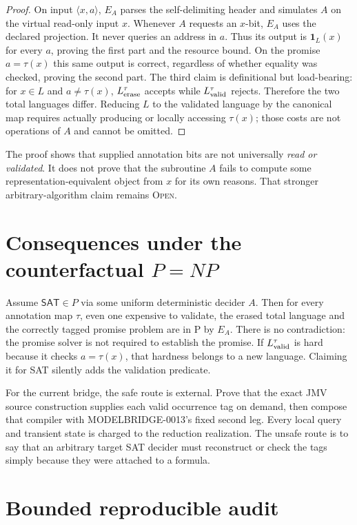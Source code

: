 \documentclass[11pt]{article}
\newcommand{\status}[1]{\textsc{#1}}
\newcommand{\SAT}{\mathsf{SAT}}
\begin{document}
\begin{proof}
On input $\langle x,a\rangle$, $E_A$ parses the self-delimiting header and
simulates $A$ on the virtual read-only input $x$.  Whenever $A$ requests an
$x$-bit, $E_A$ uses the declared projection.  It never queries an address in
$a$.  Thus its output is $\mathbf1_L(x)$ for every $a$, proving the first
part and the resource bound.  On the promise $a=\tau(x)$ this same output is
correct, regardless of whether equality was checked, proving the second
part.  The third claim is definitional but load-bearing: for $x\in L$ and
$a\ne\tau(x)$, $L_{\rm erase}^{\tau}$ accepts while
$L_{\rm valid}^{\tau}$ rejects.  Therefore the two total languages differ.
Reducing $L$ to the validated language by the canonical map requires actually
producing or locally accessing $\tau(x)$; those costs are not operations of
$A$ and cannot be omitted.
\end{proof}

The proof shows that supplied annotation bits are not universally
\emph{read or validated}.  It does not prove that the subroutine $A$ fails to
compute some representation-equivalent object from $x$ for its own reasons.
That stronger arbitrary-algorithm claim remains \status{Open}.

\section{Consequences under the counterfactual $P=NP$}

Assume $\SAT\in P$ via some uniform deterministic decider $A$.  Then for
every annotation map $\tau$, even one expensive to validate, the erased total
language and the correctly tagged promise problem are in P by $E_A$.  There
is no contradiction: the promise solver is not required to establish the
promise.  If $L_{\rm valid}^{\tau}$ is hard because it checks $a=\tau(x)$,
that hardness belongs to a new language.  Claiming it for SAT silently adds
the validation predicate.

For the current bridge, the safe route is external.  Prove that the exact
JMV source construction supplies each valid occurrence tag on demand, then
compose that compiler with MODELBRIDGE-0013's fixed second leg.  Every local
query and transient state is charged to the reduction realization.  The
unsafe route is to say that an arbitrary target SAT decider must reconstruct
or check the tags simply because they were attached to a formula.

\section{Bounded reproducible audit}
\end{document}
